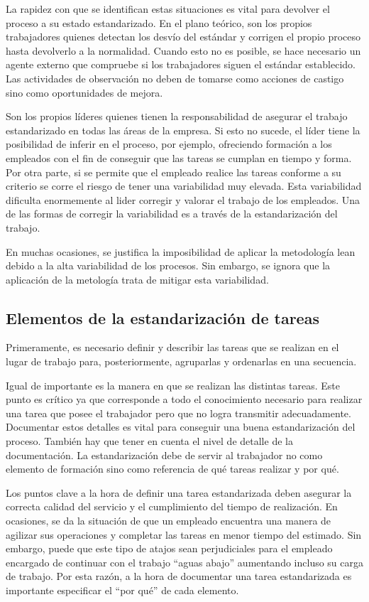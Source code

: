 La rapidez con que se identifican estas situaciones es vital para devolver el proceso a su estado estandarizado.
En el plano teórico, son los propios trabajadores quienes detectan los desvío del estándar y corrigen el propio proceso hasta devolverlo a la normalidad.
Cuando esto no es posible, se hace necesario un agente externo que compruebe si los trabajadores siguen el estándar establecido.
Las actividades de observación no deben de tomarse como acciones de castigo sino como oportunidades de mejora.

Son los propios líderes quienes tienen la responsabilidad de asegurar el trabajo estandarizado en todas las áreas de la empresa. Si esto no sucede, el líder tiene la posibilidad de inferir en el proceso, por ejemplo, ofreciendo formación a los empleados con el fin de conseguir que las tareas se cumplan en tiempo y forma. Por otra parte, si se permite que el empleado realice las tareas conforme a su criterio se corre el riesgo de tener una variabilidad muy elevada. Esta variabilidad dificulta enormemente al lider corregir y valorar el trabajo de los empleados. Una de las formas de corregir la variabilidad es a través de la estandarización del trabajo.

En muchas ocasiones, se justifica la imposibilidad de aplicar la metodología lean debido a la alta variabilidad de los procesos. Sin embargo, se ignora que la aplicación de la metología trata de mitigar esta variabilidad.

\subsection{Elementos de la estandarización de tareas}

Primeramente, es necesario definir y describir las tareas que se realizan en el lugar de trabajo para, posteriormente, agruparlas y ordenarlas en una secuencia.

Igual de importante es la manera en que se realizan las distintas tareas.
Este punto es crítico ya que corresponde a todo el conocimiento necesario para realizar una tarea que posee el trabajador pero que no logra transmitir adecuadamente. Documentar estos detalles es vital para conseguir una buena estandarización del proceso.
También hay que tener en cuenta el nivel de detalle de la documentación.
La estandarización debe de servir al trabajador no como elemento de formación sino como referencia de qué tareas realizar y por qué.

Los puntos clave a la hora de definir una tarea estandarizada deben asegurar la correcta calidad del servicio y el cumplimiento del tiempo de realización.
En ocasiones, se da la situación de que un empleado encuentra una manera de agilizar sus operaciones y completar las tareas en menor tiempo del estimado.
Sin embargo, puede que este tipo de atajos sean perjudiciales para el empleado encargado de continuar con el trabajo ``aguas abajo'' aumentando incluso su carga de trabajo. Por esta razón, a la hora de documentar una tarea estandarizada es importante especificar el ``por qué'' de cada elemento.

